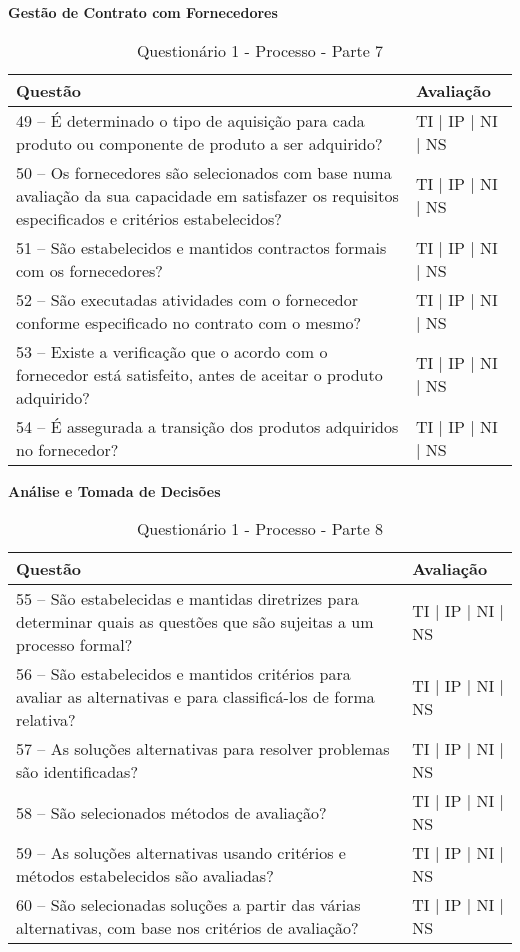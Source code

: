 \documentclass[openany,10pt,a4paper]{article}
\begin{document}
\begin{longtable}
\begin{appendix}
\begin{table}[h]
\textbf{Gestão de Contrato com Fornecedores}
	\centering
	\caption{Questionário 1 - Processo - Parte 7}
	\begin{tabular}{p{3.5in}p{2in}}		
		\toprule
		\textbf{Questão}  & \textbf{Avaliação}\\ 
		\midrule
		49 – É determinado o tipo de aquisição para cada produto ou componente de produto a ser 
adquirido?
 & TI | IP | NI | NS \\
        \midrule
		50 – Os fornecedores são selecionados com base numa avaliação da sua capacidade em 
satisfazer os requisitos especificados e critérios estabelecidos?
 & TI | IP | NI | NS \\
		\midrule
		51 – São estabelecidos e mantidos contractos formais com os fornecedores?
 & TI | IP | NI | NS \\
		\midrule
        52 – São executadas atividades com o fornecedor conforme especificado no contrato com o 
mesmo?
 & TI | IP | NI | NS \\
		\midrule
		53 – Existe a verificação que o acordo com o fornecedor está satisfeito, antes de aceitar o 
produto adquirido?
  & TI | IP | NI | NS \\
		\midrule
		54 – É assegurada a transição dos produtos adquiridos no fornecedor?
 & TI | IP | NI | NS \\
		\bottomrule
	\end{tabular} 
	\label{tab:tabela1}
\end{table}

\begin{table}[h]
\textbf{Análise e Tomada de Decisões}
	\centering
	\caption{Questionário 1 - Processo - Parte 8}
	\begin{tabular}{p{3.5in}p{2in}}		
		\toprule
		\textbf{Questão}  & \textbf{Avaliação}\\ 
		\midrule
		55 – São estabelecidas e mantidas diretrizes para determinar quais as questões que são sujeitas 
a um processo formal?
 & TI | IP | NI | NS \\
        \midrule
		56 – São estabelecidos e mantidos critérios para avaliar as alternativas e para classificá-los de 
forma relativa?
 & TI | IP | NI | NS \\
		\midrule
		57 – As soluções alternativas para resolver problemas são identificadas?
 & TI | IP | NI | NS \\
		\midrule
        58 – São selecionados métodos de avaliação?
 & TI | IP | NI | NS \\
		\midrule
		59 – As soluções alternativas usando critérios e métodos estabelecidos são avaliadas?
  & TI | IP | NI | NS \\
		\midrule
		60 – São selecionadas soluções a partir das várias alternativas, com base nos critérios de 
avaliação?
 & TI | IP | NI | NS \\
		\bottomrule
	\end{tabular} 
	\label{tab:tabela1}
\end{table}


\end{appendix}
\end{longtable}
\end{document}
